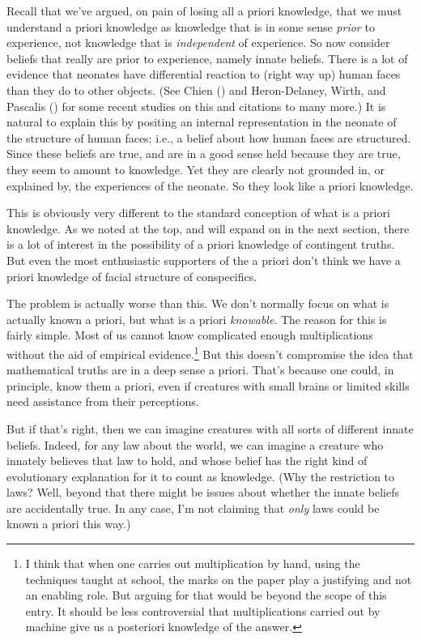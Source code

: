 \documentclass[
  11pt,
  letterpaper,
  DIV=11,
  numbers=noendperiod,
  twoside]{scrartcl}
\begin{document}
Recall that we've argued, on pain of losing all a priori knowledge, that
we must understand a priori knowledge as knowledge that is in some sense
\emph{prior} to experience, not knowledge that is \emph{independent} of
experience. So now consider beliefs that really are prior to experience,
namely innate beliefs. There is a lot of evidence that neonates have
differential reaction to (right way up) human faces than they do to
other objects. (See Chien () and
Heron-Delaney, Wirth, and Pascalis
() for some recent studies on this
and citations to many more.) It is natural to explain this by positing
an internal representation in the neonate of the structure of human
faces; i.e., a belief about how human faces are structured. Since these
beliefs are true, and are in a good sense held because they are true,
they seem to amount to knowledge. Yet they are clearly not grounded in,
or explained by, the experiences of the neonate. So they look like a
priori knowledge.

This is obviously very different to the standard conception of what is a
priori knowledge. As we noted at the top, and will expand on in the next
section, there is a lot of interest in the possibility of a priori
knowledge of contingent truths. But even the most enthusiastic
supporters of the a priori don't think we have a priori knowledge of
facial structure of conspecifics.

The problem is actually worse than this. We don't normally focus on what
is actually known a priori, but what is a priori \emph{knowable}. The
reason for this is fairly simple. Most of us cannot know complicated
enough multiplications without the aid of empirical evidence.\footnote{I
  think that when one carries out multiplication by hand, using the
  techniques taught at school, the marks on the paper play a justifying
  and not an enabling role. But arguing for that would be beyond the
  scope of this entry. It should be less controversial that
  multiplications carried out by machine give us a posteriori knowledge
  of the answer.} But this doesn't compromise the idea that mathematical
truths are in a deep sense a priori. That's because one could, in
principle, know them a priori, even if creatures with small brains or
limited skills need assistance from their perceptions.

But if that's right, then we can imagine creatures with all sorts of
different innate beliefs. Indeed, for any law about the world, we can
imagine a creature who innately believes that law to hold, and whose
belief has the right kind of evolutionary explanation for it to count as
knowledge. (Why the restriction to laws? Well, beyond that there might
be issues about whether the innate beliefs are accidentally true. In any
case, I'm not claiming that \emph{only} laws could be known a priori
this way.)
\end{document}
